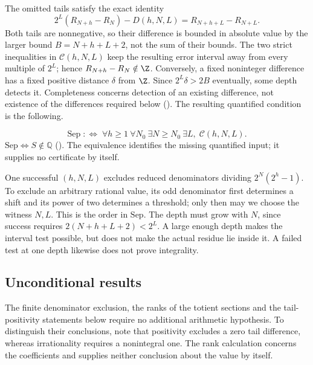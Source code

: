 The omitted tails satisfy the exact identity
\[
 2^L(R_{N+h}-R_N)-D(h,N,L)=R_{N+h+L}-R_{N+L}.
\]
Both tails are nonnegative, so their difference is bounded in absolute
value by the larger bound $B=N+h+L+2$, not the sum of their bounds.
The two strict inequalities in $\mathcal C(h,N,L)$ keep the resulting
error interval away from every multiple of $2^L$; hence
$R_{N+h}-R_N\notin\Z$.
Conversely, a fixed noninteger difference has a fixed positive distance
$\delta$ from $\Z$. Since $2^L\delta>2B$ eventually, some depth
detects it. Completeness concerns detection of an existing difference,
not existence of the differences required below
().
The resulting quantified condition is the following.

\begin{defn}
\label{defn:sep}
\[
  \mathrm{Sep}
  \;:\Longleftrightarrow\;
  \forall h \ge 1\ \forall N_0\ \exists N \ge N_0\ \exists L,\;
  \mathcal{C}(h,N,L).
\]
$\mathrm{Sep} \Longleftrightarrow S\notin\mathbb Q$
().
The equivalence identifies the missing quantified input; it supplies no
certificate by itself.
\end{defn}

One successful $(h,N,L)$ excludes reduced denominators dividing
$2^N(2^h-1)$. To exclude an arbitrary rational value, its odd denominator
first determines a shift and its power of two determines a threshold;
only then may we choose the witness $N,L$. This is the order in
$\mathrm{Sep}$. The depth must grow with $N$, since success requires
$2(N+h+L+2)<2^L$. A large enough depth makes the interval test possible,
but does not make the actual residue lie inside it. A failed test
at one depth likewise does not prove integrality.


\subsection{Unconditional results}

The finite denominator exclusion, the ranks of the totient sections
and the tail-positivity statements below require no additional
arithmetic hypothesis. To distinguish their conclusions, note that
positivity excludes a zero tail difference, whereas irrationality
requires a nonintegral one. The rank calculation concerns the
coefficients and supplies neither conclusion about the value by itself.

